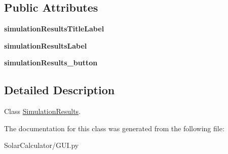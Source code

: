 \subsection*{Public Attributes}
\begin{DoxyCompactItemize}
\item 
\hypertarget{class_solar_calculator_1_1_g_u_i_1_1_simulation_results_aefbc3737e2b4cc14ffb776d4b7cfc70d}{{\bfseries simulation\-Results\-Title\-Label}}\label{class_solar_calculator_1_1_g_u_i_1_1_simulation_results_aefbc3737e2b4cc14ffb776d4b7cfc70d}

\item 
\hypertarget{class_solar_calculator_1_1_g_u_i_1_1_simulation_results_a493b576e5981c2f89d37edbf6e477ff8}{{\bfseries simulation\-Results\-Label}}\label{class_solar_calculator_1_1_g_u_i_1_1_simulation_results_a493b576e5981c2f89d37edbf6e477ff8}

\item 
\hypertarget{class_solar_calculator_1_1_g_u_i_1_1_simulation_results_a32366097e16a00251ef087990b919693}{{\bfseries simulation\-Results\-\_\-button}}\label{class_solar_calculator_1_1_g_u_i_1_1_simulation_results_a32366097e16a00251ef087990b919693}

\end{DoxyCompactItemize}


\subsection{Detailed Description}
Class \hyperlink{class_solar_calculator_1_1_g_u_i_1_1_simulation_results}{Simulation\-Results}. 

The documentation for this class was generated from the following file\-:\begin{DoxyCompactItemize}
\item 
Solar\-Calculator/G\-U\-I.\-py\end{DoxyCompactItemize}
